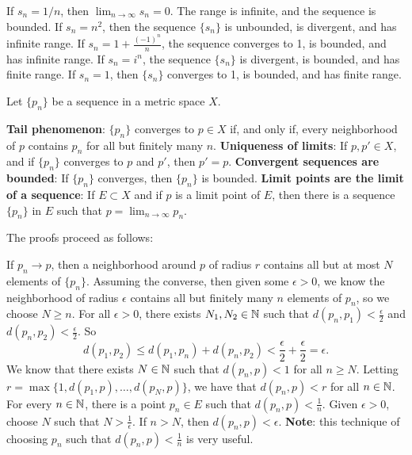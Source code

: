 \documentclass{article}
\begin{document}
\begin{example}
\listhack 
\begin{enumerate}
    \ii If $s_{n}=1/n$, then $\lim_{n\rightarrow\infty}s_{n}=0$. The range is infinite, and the sequence is bounded.
    \ii If $s_{n}=n^{2}$, then the sequence $\{s_{n}\}$ is unbounded, is divergent, and has infinite range.
    \ii If $s_{n}=1+\frac{(-1)^{n}}{n}$, the sequence converges to 1, is bounded, and has infinite range.
    \ii If $s_{n}=i^{n}$, the sequence $\{s_{n}\}$ is divergent, is bounded, and has finite range.
    \ii If $s_{n}=1$, then $\{s_{n}\}$ converges to 1, is bounded, and has finite range.
\end{enumerate}
\end{example}
\begin{theorem} 
    Let $\{p_{n}\}$ be a sequence in a metric space $X$.
    \begin{enumerate}
        \ii \textbf{Tail phenomenon}: $\{p_{n}\}$ converges to $p\in X$ if, and only if, every neighborhood of $p$ contains $p_{n}$ for all but finitely many $n$.
        \ii \textbf{Uniqueness of limits}: If $p,p'\in X$, and if $\{p_{n}\}$ converges to $p$ and $p'$, then $p'=p$.
        \ii \textbf{Convergent sequences are bounded}: If $\{p_{n}\}$ converges, then $\{p_{n}\}$ is bounded.
        \ii \textbf{Limit points are the limit of a sequence}: If $E\subset X$ and if $p$ is a limit point of $E$, then there is a sequence $\{p_{n}\}$ in $E$ such that $p=\lim_{n\rightarrow\infty}p_{n}$.
    \end{enumerate}
\end{theorem}
\begin{remark}
    The proofs proceed as follows:
    \begin{enumerate}
        \ii If $p_{n}\rightarrow p$, then a neighborhood around $p$ of radius $r$ contains all but at most $N$ elements of $\{p_{n}\}$. Assuming the converse, then given some $\epsilon>0$, we know the neighborhood of radius $\epsilon$ contains all but finitely many $n$ elements of $p_{n}$, so we choose $N\geq n$.
        \ii For all $\epsilon>0$, there exists $N_{1},N_{2}\in\mathbb N$ such that $d(p_{n},p_{1})<\frac{\epsilon}{2}$ and $d(p_{n},p_{2})<\frac{\epsilon}{2}$. So 
            \[d(p_{1},p_{2})\leq d(p_{1},p_{n})+d(p_{n},p_{2}) < \frac{\epsilon}{2}+\frac{\epsilon}{2}=\epsilon.\]
        \ii We know that there exists $N\in\mathbb N$ such that $d(p_{n},p)<1$ for all $n\geq N$. Letting $r=\max\{1,d(p_{1},p),\dotsc,d(p_{N},p)\}$, we have that $d(p_{n},p)<r$ for all $n\in\mathbb N$.
        \ii For every $n\in\mathbb N$, there is a point $p_{n}\in E$  such that $d(p_{n},p)<\frac{1}{n}$. Given $\epsilon>0$, choose $N$ such that $N>\frac{1}{\epsilon}$. If $n>N$, then $d(p_{n},p)<\epsilon$.  \textbf{Note}: this technique of choosing $p_{n}$ such that $d(p_{n},p)<\frac{1}{n}$ is very useful.
    \end{enumerate}
\end{remark}
\end{document}

